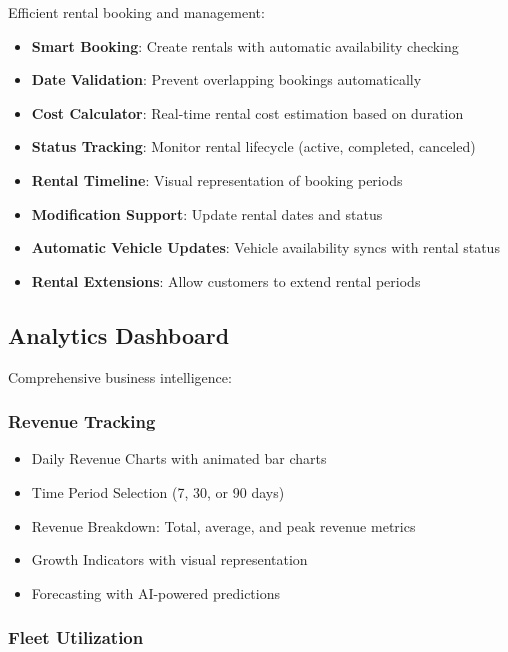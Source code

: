 \documentclass[12pt,a4paper]{article}
\begin{document}
Efficient rental booking and management:

\begin{itemize}[leftmargin=*]
    \item \textbf{Smart Booking}: Create rentals with automatic availability checking
    \item \textbf{Date Validation}: Prevent overlapping bookings automatically
    \item \textbf{Cost Calculator}: Real-time rental cost estimation based on duration
    \item \textbf{Status Tracking}: Monitor rental lifecycle (active, completed, canceled)
    \item \textbf{Rental Timeline}: Visual representation of booking periods
    \item \textbf{Modification Support}: Update rental dates and status
    \item \textbf{Automatic Vehicle Updates}: Vehicle availability syncs with rental status
    \item \textbf{Rental Extensions}: Allow customers to extend rental periods
\end{itemize}

\subsection{Analytics Dashboard}

Comprehensive business intelligence:

\subsubsection{Revenue Tracking}

\begin{itemize}[leftmargin=*]
    \item Daily Revenue Charts with animated bar charts
    \item Time Period Selection (7, 30, or 90 days)
    \item Revenue Breakdown: Total, average, and peak revenue metrics
    \item Growth Indicators with visual representation
    \item Forecasting with AI-powered predictions
\end{itemize}

\subsubsection{Fleet Utilization}
\end{document}
